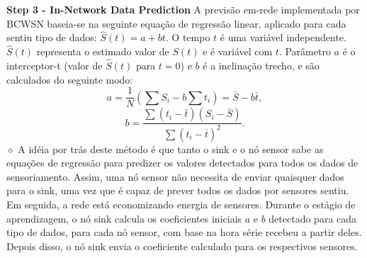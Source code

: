 \documentclass{acm_proc_article-sp}
\newcommand{\dia}{\hspace*{.1cm} \hfill $\diamond$}
\begin{document}
{\bf Step 3 - In-Network Data Prediction}
A previsão em-rede implementada por BCWSN baseia-se na 
seguinte equação de regressão linear, aplicado para cada sentiu tipo de dados:
$\hat{S}(t) = a + bt$.
O tempo $t$ é uma variável independente. $\hat{S}(t)$ representa o estimado 
valor de $S(t) $ e é variável com $ t $. Parâmetro $ a $ é o interceptor-t 
(valor de $\hat{S}(t)$ para $t=0$) e $b$ é a inclinação trecho, e são calculados 
do seguinte modo:
\begin{equation}
\label{coef-a}
	a = \frac{1}{N}\left(\sum S_{i} - b\sum t_{i} \right) = \bar{S} - b\bar{t},
\end{equation}
\vspace*{-.3cm}
\begin{equation}
\label{coef-b}
	b = \frac{\sum \left(t_{i} - \bar{t}\right)\left(S_{i} - \bar{S}\right)}{\sum \left(t_{i} - \bar{t}\right)^{2}}.
\end{equation}
	\dia
\vspace*{-.4cm}
A idéia por trás deste método é que tanto o sink e o nó sensor sabe as 
equações de regressão para predizer os valores detectados para
todos os dados de sensoriamento. Assim, uma nó sensor não necessita de
enviar quaisquer dados para o sink, uma vez que é capaz de prever 
todos os dados por sensores sentiu. Em seguida, a rede está economizando
energia de sensores\cite{MaiaACR2013}.
\vspace*{-.3cm}
Durante o estágio de aprendizagem, o nó sink calcula os coeficientes
iniciais $a$ e $b$ detectado para cada tipo de dados, para cada nó sensor,
com base na hora série recebeu a partir deles. Depois disso,
o nó sink envia o coeficiente calculado para os respectivos sensores.
\vspace*{-.3cm}
\end{document}

